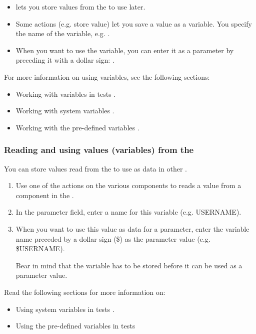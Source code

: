 
\begin{itemize}
\item \app{} lets you store values from the \gdaut{} to use later.
\item Some actions (e.g. store value) let you save a value as a variable. You specify the name of the variable, e.g. . 
\item When you want to use the variable, you can enter it as a parameter by preceding it with a dollar sign: . 
\end{itemize}
For more information on using variables, see the following sections:
\begin{itemize}
\item Working with variables in tests .
\item Working with system variables .
\item Working with the \app{} pre-defined variables .
\end{itemize}

\subsubsection{Reading and using values (variables) from the \gdaut{}}
\label{TasksAUTVariables}

You can store values read from the \gdaut{} to use as data in other \gdcases{}. 

\begin{enumerate}
\item Use one of  the  actions on the various components to  reads a value from a component in the \gdaut{}. 

\item In the parameter field, enter a name for this variable (e.g. USERNAME). 

\item When you want to use this value as data for a parameter, enter the variable name preceded by a dollar sign (\$) as the parameter value (e.g. \$USERNAME).

Bear in mind that the variable has to be stored before it can be used as a parameter value.  

\end{enumerate}
Read the following sections for more information on:
\begin{itemize}
\item Using system variables in tests . 
\item Using the pre-defined \app{} variables in tests 
\end{itemize}

